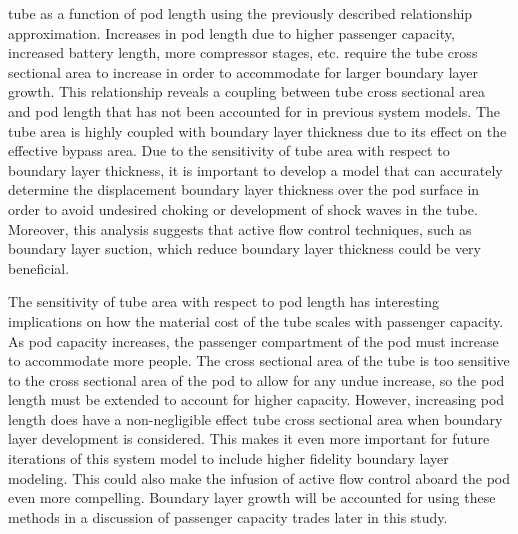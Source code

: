 tube as a function of pod length using the previously described relationship
approximation. Increases in pod length due to higher passenger
capacity, increased battery length, more compressor stages, etc. require the
tube cross sectional area to increase in order to accommodate for larger
boundary layer growth. This relationship reveals a coupling between tube cross
sectional area and pod length that has not been accounted for in previous system models.
The tube area is highly coupled with boundary layer thickness due to its effect on the effective bypass area.
Due to the sensitivity of tube area with respect to boundary layer thickness,
it is important to develop a model that can accurately determine the
displacement boundary layer thickness over the pod surface in order to avoid
undesired choking or development of shock waves in the tube. Moreover,
this analysis suggests that active flow control techniques, such as boundary layer suction,
which reduce boundary layer thickness could be very beneficial.

The sensitivity of tube area with respect to pod length has interesting implications on how the material cost of the tube
scales with passenger capacity. As pod capacity increases, the passenger compartment of the pod
must increase to accommodate more people. The cross sectional area of the tube is too sensitive to the cross sectional
area of the pod to allow for any undue increase, so the pod length must be extended to account for higher capacity.
However, increasing pod length does have a non-negligible effect tube cross sectional area when boundary layer 
development is considered. This makes it even more important for future iterations of this system model to include
higher fidelity boundary layer modeling. This could also make the infusion of active flow control aboard
the pod even more compelling. Boundary layer growth will be accounted for using these methods in a discussion of 
passenger capacity trades later in this study. 
